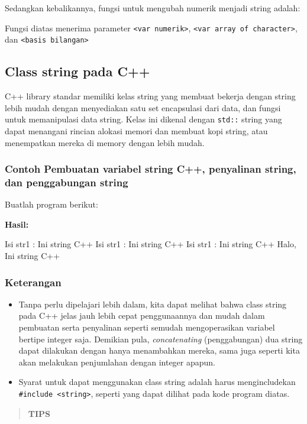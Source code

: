 {{

Sedangkan kebalikannya, fungsi untuk mengubah numerik menjadi string
adalah:



Fungsi diatas menerima parameter
\texttt{\textless{}var\ numerik\textgreater{}},
\texttt{\textless{}var\ array\ of\ character\textgreater{}}, dan
\texttt{\textless{}basis\ bilangan\textgreater{}}

\subsection{Class string pada C++}\label{class-string-pada-c}

C++ library standar memiliki kelas string yang membuat bekerja dengan
string lebih mudah dengan menyediakan satu set encapsulasi dari data,
dan fungsi untuk memanipulasi data string. Kelas ini dikenal dengan
\texttt{std::} string yang dapat menangani rincian alokasi memori dan
membuat kopi string, atau menempatkan mereka di memory dengan lebih
mudah.

\subsubsection*{Contoh Pembuatan variabel string C++, penyalinan string, dan
penggabungan string}

Buatlah program berikut:



\textbf{Hasil:}

\begin{lcverbatim}
Isi str1 : Ini string C++
Isi str1 : Ini string C++
Isi str1 : Ini string C++
Halo, Ini string C++
\end{lcverbatim}

\subsubsection*{Keterangan}

\begin{itemize}

\item
 Tanpa perlu dipelajari lebih dalam, kita dapat melihat bahwa class
 string pada C++ jelas jauh lebih cepat penggunaannya dan mudah dalam
 pembuatan serta penyalinan seperti semudah mengoperasikan variabel
 bertipe integer saja. Demikian pula, \emph{concatenating}
 (penggabungan) dua string dapat dilakukan dengan hanya menambahkan
 mereka, sama juga seperti kita akan melakukan penjumlahan dengan
 integer apapun.
\item
 Syarat untuk dapat menggunakan class string adalah harus
 mengincludekan \texttt{\#include\ \textless{}string\textgreater{}},
 seperti yang dapat dilihat pada kode program diatas.
\end{itemize}
\begin{quotation}
{\LARGE {}} \textbf{TIPS}


\end{quotation}}}
